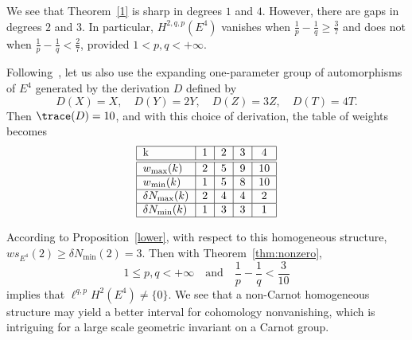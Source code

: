 We see that Theorem~\ref{1} is sharp in degrees $1$ and $4$. However, there are gaps in degrees $2$ and $3$. In particular, $H^{2,q,p}(E^4)$ vanishes when $\frac{1}{p}- \frac{1}{q} \geq \frac{3}{7}$ and does not when $\frac{1}{p}- \frac{1}{q} < \frac{2}{7}$, provided $1<p, q< +\infty$.

Following~\cite[Section~4.2]{Rumin_TSG}, let us also use the expanding one-parameter group of automorphisms of $E^4$ generated by the derivation $D$ defined by
\[
D(X)=X,\quad D(Y)=2Y,\quad D(Z)=3Z,\quad D(T)= 4T.
\]
Then $\trace(D)=10$, and with this choice of derivation, the table of weights becomes
\[
\begin{tabular}{|l|c|c|c|c|}
\hline k & 1 & 2 & 3 & 4 \\
\hline\hline $w_{\max}(k)$ & 2 & 5 & 9 & 10 \\
\hline $w_{\min}(k)$ & 1 & 5 & 8 & 10 \\
\hline $\delta N_{\max}(k)$ & 2 & 4 & 4 & 2 \\
\hline $\delta N_{\min}(k)$ & 1 & 3 & 3 & 1 \\
\hline
\end{tabular}
\]

According to Proposition~\ref{lower}, with respect to this homogeneous structure, $ws_{E^4}(2)\geq \delta N_{\min}(2)=3$. Then with Theorem~\ref{thm:nonzero},
\[
1\leq p,q<+\infty \quad \text{and} \quad \frac{1}{p}-
\frac{1}{q}<\frac{3}{10}
\]
implies that $\ell^{q,p}H^2(E^4)\not= \{0\}$. We see that a non-Carnot homogeneous structure may yield a better interval for cohomology nonvanishing, which is intriguing for a large scale geometric invariant on a Carnot group.



